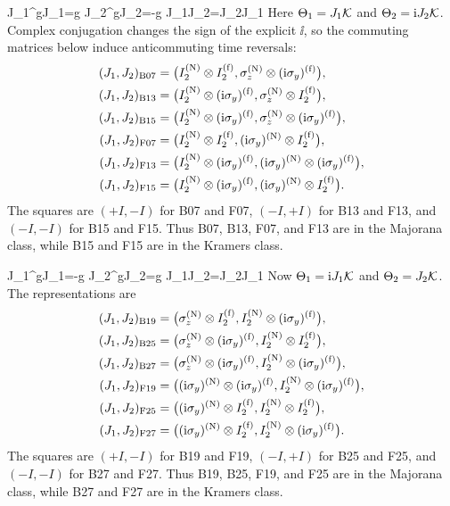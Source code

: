 {J_1^\trans gJ_1=g}
{J_2^\trans gJ_2=-g}
{J_1J_2=J_2J_1}
Here \(\Theta_1=J_1\mathcal{K}\) and \(\Theta_2=\mathrm{i} J_2\mathcal{K}\).  Complex
conjugation changes the sign of the explicit \(\ii\), so the commuting
matrices below induce anticommuting time reversals:
\begin{align*}
(J_1,J_2)_{\rm B07}={}&
 \bigl(I_2^{({\rm N})}\otimes I_2^{({\rm f})},
 \sigma_z^{({\rm N})}\otimes(\mathrm{i}\sigma_y)^{({\rm f})}\bigr),\\
(J_1,J_2)_{\rm B13}={}&
 \bigl(I_2^{({\rm N})}\otimes(\mathrm{i}\sigma_y)^{({\rm f})},
 \sigma_z^{({\rm N})}\otimes I_2^{({\rm f})}\bigr),\\
(J_1,J_2)_{\rm B15}={}&
 \bigl(I_2^{({\rm N})}\otimes(\mathrm{i}\sigma_y)^{({\rm f})},
 \sigma_z^{({\rm N})}\otimes(\mathrm{i}\sigma_y)^{({\rm f})}\bigr),\\
(J_1,J_2)_{\rm F07}={}&
 \bigl(I_2^{({\rm N})}\otimes I_2^{({\rm f})},
 (\mathrm{i}\sigma_y)^{({\rm N})}\otimes I_2^{({\rm f})}\bigr),\\
(J_1,J_2)_{\rm F13}={}&
 \bigl(I_2^{({\rm N})}\otimes(\mathrm{i}\sigma_y)^{({\rm f})},
 (\mathrm{i}\sigma_y)^{({\rm N})}\otimes(\mathrm{i}\sigma_y)^{({\rm f})}\bigr),\\
(J_1,J_2)_{\rm F15}={}&
 \bigl(I_2^{({\rm N})}\otimes(\mathrm{i}\sigma_y)^{({\rm f})},
 (\mathrm{i}\sigma_y)^{({\rm N})}\otimes I_2^{({\rm f})}\bigr).
\end{align*}
The squares are \((+I,-I)\) for B07 and F07, \((-I,+I)\) for
B13 and F13, and \((-I,-I)\) for B15 and F15.  Thus B07, B13, F07,
and F13 are in the Majorana class, while B15 and F15 are in the Kramers
class.

{J_1^\trans gJ_1=-g}
{J_2^\trans gJ_2=g}
{J_1J_2=J_2J_1}
Now \(\Theta_1=\mathrm{i} J_1\mathcal{K}\) and \(\Theta_2=J_2\mathcal{K}\).  The
representations are
\begin{align*}
(J_1,J_2)_{\rm B19}={}&
 \bigl(\sigma_z^{({\rm N})}\otimes I_2^{({\rm f})},
 I_2^{({\rm N})}\otimes(\mathrm{i}\sigma_y)^{({\rm f})}\bigr),\\
(J_1,J_2)_{\rm B25}={}&
 \bigl(\sigma_z^{({\rm N})}\otimes(\mathrm{i}\sigma_y)^{({\rm f})},
 I_2^{({\rm N})}\otimes I_2^{({\rm f})}\bigr),\\
(J_1,J_2)_{\rm B27}={}&
 \bigl(\sigma_z^{({\rm N})}\otimes(\mathrm{i}\sigma_y)^{({\rm f})},
 I_2^{({\rm N})}\otimes(\mathrm{i}\sigma_y)^{({\rm f})}\bigr),\\
(J_1,J_2)_{\rm F19}={}&
 \bigl((\mathrm{i}\sigma_y)^{({\rm N})}\otimes(\mathrm{i}\sigma_y)^{({\rm f})},
 I_2^{({\rm N})}\otimes(\mathrm{i}\sigma_y)^{({\rm f})}\bigr),\\
(J_1,J_2)_{\rm F25}={}&
 \bigl((\mathrm{i}\sigma_y)^{({\rm N})}\otimes I_2^{({\rm f})},
 I_2^{({\rm N})}\otimes I_2^{({\rm f})}\bigr),\\
(J_1,J_2)_{\rm F27}={}&
 \bigl((\mathrm{i}\sigma_y)^{({\rm N})}\otimes I_2^{({\rm f})},
 I_2^{({\rm N})}\otimes(\mathrm{i}\sigma_y)^{({\rm f})}\bigr).
\end{align*}
The squares are \((+I,-I)\) for B19 and F19, \((-I,+I)\) for
B25 and F25, and \((-I,-I)\) for B27 and F27.  Thus B19, B25, F19,
and F25 are in the Majorana class, while B27 and F27 are in the Kramers
class.

